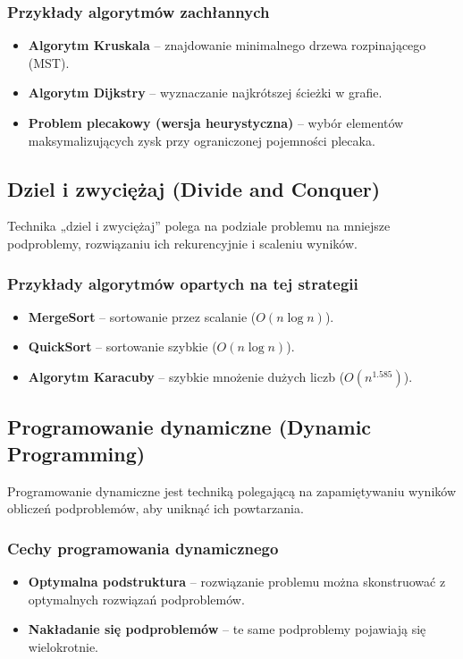 \subsubsection{Przykłady algorytmów zachłannych}
\begin{itemize}
    \item \textbf{Algorytm Kruskala} – znajdowanie minimalnego drzewa rozpinającego (MST).
    \item \textbf{Algorytm Dijkstry} – wyznaczanie najkrótszej ścieżki w grafie.
    \item \textbf{Problem plecakowy (wersja heurystyczna)} – wybór elementów maksymalizujących zysk przy ograniczonej pojemności plecaka.
\end{itemize}

\subsection{Dziel i zwyciężaj (Divide and Conquer)}
Technika „dziel i zwyciężaj” polega na podziale problemu na mniejsze podproblemy, rozwiązaniu ich rekurencyjnie i scaleniu wyników.

\subsubsection{Przykłady algorytmów opartych na tej strategii}
\begin{itemize}
    \item \textbf{MergeSort} – sortowanie przez scalanie (\( O(n \log n) \)).
    \item \textbf{QuickSort} – sortowanie szybkie (\( O(n \log n) \)).
    \item \textbf{Algorytm Karacuby} – szybkie mnożenie dużych liczb (\( O(n^{1.585}) \)).
\end{itemize}

\subsection{Programowanie dynamiczne (Dynamic Programming)}
Programowanie dynamiczne jest techniką polegającą na zapamiętywaniu wyników obliczeń podproblemów, aby uniknąć ich powtarzania.

\subsubsection{Cechy programowania dynamicznego}
\begin{itemize}
    \item \textbf{Optymalna podstruktura} – rozwiązanie problemu można skonstruować z optymalnych rozwiązań podproblemów.
    \item \textbf{Nakładanie się podproblemów} – te same podproblemy pojawiają się wielokrotnie.
\end{itemize}

